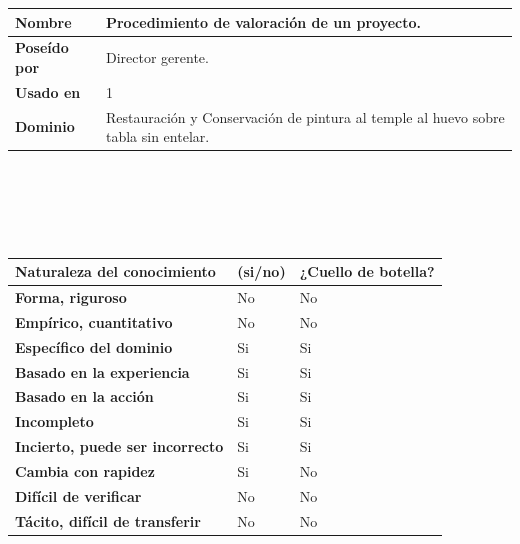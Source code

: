 \documentclass[a4paper,11pt]{article}
\begin{document}
			\begin{center}
				\begin{tabular}{| p{3cm} | p{8.85cm} |}
					\hline
					\cellcolor[RGB]{224,233,250}\textbf{Nombre} & Procedimiento de valoración
					de un proyecto.\\
					\hline
					\cellcolor[RGB]{224,233,250}\textbf{Poseído por} & Director gerente.\\
					\hline
					\cellcolor[RGB]{224,233,250}\textbf{Usado en} & 1\\
					\hline
					\cellcolor[RGB]{224,233,250}\textbf{Dominio} & Restauración y Conservación
					de pintura al temple al huevo sobre tabla sin entelar.\\
					\hline
				\end{tabular}
				\\
				\textbf{}
				\\
				\\
				\textbf{}
				\\
				\begin{tabular}{| p{6.3cm} | l | p{3.8cm} |}
					\hline
					\cellcolor[RGB]{224,233,250}\textbf{Naturaleza del conocimiento} &
					\cellcolor[RGB]{224,233,250}\textbf{(si/no)} &
					\cellcolor[RGB]{224,233,250}\textbf{¿Cuello de botella?}\\
					\hline
					\cellcolor[RGB]{224,233,250}\textbf{Forma, riguroso} & No & No\\
					\hline
					\cellcolor[RGB]{224,233,250}\textbf{Empírico, cuantitativo} & No & No\\
					\hline
					\cellcolor[RGB]{224,233,250}\textbf{Específico del dominio} & Si & Si\\
					\hline
					\cellcolor[RGB]{224,233,250}\textbf{Basado en la experiencia} & Si & Si\\
					\hline
					\cellcolor[RGB]{224,233,250}\textbf{Basado en la acción} & Si & Si\\
					\hline
					\cellcolor[RGB]{224,233,250}\textbf{Incompleto} & Si & Si\\
					\hline
					\cellcolor[RGB]{224,233,250}\textbf{Incierto, puede ser incorrecto} & Si &
					Si\\
					\hline
					\cellcolor[RGB]{224,233,250}\textbf{Cambia con rapidez} & Si & No\\
					\hline
					\cellcolor[RGB]{224,233,250}\textbf{Difícil de verificar} & No & No\\
					\hline
					\cellcolor[RGB]{224,233,250}\textbf{Tácito, difícil de transferir} & No &
					No\\

\end{tabular}
\end{center}
\end{document}
